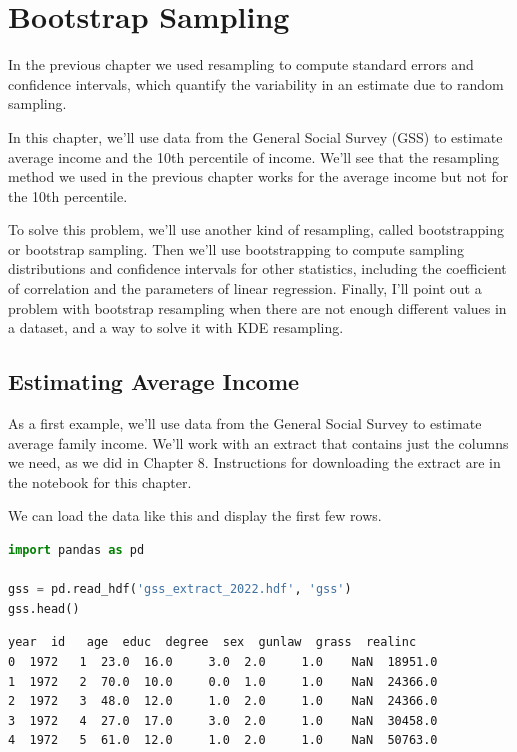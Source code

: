 \hypertarget{bootstrap-sampling}{%
\chapter{Bootstrap Sampling}\label{bootstrap-sampling}}

In the previous chapter we used resampling to compute standard errors
and confidence intervals, which quantify the variability in an estimate
due to random sampling.

In this chapter, we'll use data from the General Social Survey (GSS) to
estimate average income and the 10th percentile of income. We'll see
that the resampling method we used in the previous chapter works for the
average income but not for the 10th percentile.

To solve this problem, we'll use another kind of resampling, called
bootstrapping or bootstrap sampling. Then we'll use bootstrapping to
compute sampling distributions and confidence intervals for other
statistics, including the coefficient of correlation and the parameters
of linear regression. Finally, I'll point out a problem with bootstrap
resampling when there are not enough different values in a dataset, and
a way to solve it with KDE resampling.

\hypertarget{estimating-average-income}{%
\section{Estimating Average Income}\label{estimating-average-income}}

As a first example, we'll use data from the General Social Survey to
estimate average family income. We'll work with an extract that contains
just the columns we need, as we did in Chapter 8. Instructions for
downloading the extract are in the notebook for this chapter.

We can load the data like this and display the first few rows.

\begin{lstlisting}[language=Python,style=source]
import pandas as pd

gss = pd.read_hdf('gss_extract_2022.hdf', 'gss')
gss.head()
\end{lstlisting}

\begin{lstlisting}[style=output]
   year  id   age  educ  degree  sex  gunlaw  grass  realinc
0  1972   1  23.0  16.0     3.0  2.0     1.0    NaN  18951.0
1  1972   2  70.0  10.0     0.0  1.0     1.0    NaN  24366.0
2  1972   3  48.0  12.0     1.0  2.0     1.0    NaN  24366.0
3  1972   4  27.0  17.0     3.0  2.0     1.0    NaN  30458.0
4  1972   5  61.0  12.0     1.0  2.0     1.0    NaN  50763.0
\end{lstlisting}

